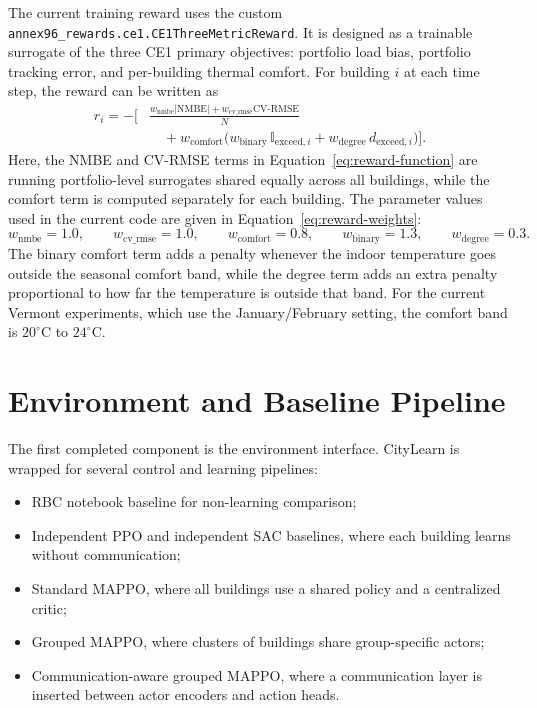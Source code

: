 The current training reward uses the custom
\texttt{annex96\_rewards.ce1.CE1ThreeMetricReward}. It is designed as a
trainable surrogate of the three CE1 primary objectives: portfolio load bias,
portfolio tracking error, and per-building thermal comfort. For building $i$ at
each time step, the reward can be written as
\begin{equation}
\label{eq:reward-function}
\begin{aligned}
r_i = -\Bigg[
&\frac{
w_{\mathrm{nmbe}}\lvert \mathrm{NMBE}\rvert
+
w_{\mathrm{cv\_rmse}}\mathrm{CV\mbox{-}RMSE}
}{N} \\
&\quad +
w_{\mathrm{comfort}}
\Big(
w_{\mathrm{binary}}\,\mathbb{I}_{\mathrm{exceed},i}
+
w_{\mathrm{degree}}\,d_{\mathrm{exceed},i}
\Big)
\Bigg].
\end{aligned}
\end{equation}
Here, the NMBE and CV-RMSE terms in Equation~\eqref{eq:reward-function} are
running portfolio-level surrogates shared equally across all buildings, while
the comfort term is computed separately for each building. The parameter values
used in the current code are given in Equation~\eqref{eq:reward-weights}:
\begin{equation}
\label{eq:reward-weights}
w_{\mathrm{nmbe}} = 1.0,\qquad
w_{\mathrm{cv\_rmse}} = 1.0,\qquad
w_{\mathrm{comfort}} = 0.8,\qquad
w_{\mathrm{binary}} = 1.3,\qquad
w_{\mathrm{degree}} = 0.3.
\end{equation}
The binary comfort term adds a penalty whenever the indoor temperature goes
outside the seasonal comfort band, while the degree term adds an extra penalty
proportional to how far the temperature is outside that band. For the current
Vermont experiments, which use the January/February setting, the comfort band
is \(20^\circ\mathrm{C}\) to \(24^\circ\mathrm{C}\).

\section{Environment and Baseline Pipeline}

The first completed component is the environment interface. CityLearn is wrapped
for several control and learning pipelines:

\begin{itemize}
  \item RBC notebook baseline for non-learning comparison;
  \item Independent PPO and independent SAC baselines, where each building
  learns without communication;
  \item Standard MAPPO, where all buildings use a shared policy and a
  centralized critic;
  \item Grouped MAPPO, where clusters of buildings share group-specific actors;
  \item Communication-aware grouped MAPPO, where a communication layer is
  inserted between actor encoders and action heads.
\end{itemize}

